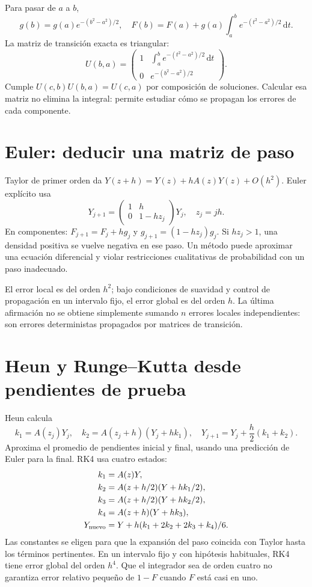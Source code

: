 \documentclass[11pt,a4paper]{article}
\newcommand{\dd}{\,\mathrm d}
\theoremstyle{definition}
\begin{document}
Para pasar de $a$ a $b$,
\[
g(b)=g(a)e^{-(b^2-a^2)/2},\quad
F(b)=F(a)+g(a)\int_a^b e^{-(t^2-a^2)/2}\dd t.
\]
La matriz de transición exacta es triangular:
\[
U(b,a)=
\begin{pmatrix}
1&\displaystyle\int_a^b e^{-(t^2-a^2)/2}\dd t\\
0&e^{-(b^2-a^2)/2}
\end{pmatrix}.
\]
Cumple $U(c,b)U(b,a)=U(c,a)$ por composición de soluciones.
Calcular esa matriz no elimina la integral: permite estudiar cómo se propagan los errores de cada componente.

\section{Euler: deducir una matriz de paso}
Taylor de primer orden da
$Y(z+h)=Y(z)+hA(z)Y(z)+O(h^2)$.
Euler explícito usa
\[
Y_{j+1}=
\begin{pmatrix}1&h\\0&1-hz_j\end{pmatrix}Y_j,
\quad z_j=jh.
\]
En componentes:
$F_{j+1}=F_j+hg_j$ y
$g_{j+1}=(1-hz_j)g_j$.
Si $hz_j>1$, una densidad positiva se vuelve negativa en ese paso.
Un método puede aproximar una ecuación diferencial y violar restricciones cualitativas de probabilidad con un paso inadecuado.

El error local es del orden $h^2$; bajo condiciones de suavidad y control de propagación en un intervalo fijo, el error global es del orden $h$.
La última afirmación no se obtiene simplemente sumando $n$ errores locales independientes: son errores deterministas propagados por matrices de transición.

\section{Heun y Runge--Kutta desde pendientes de prueba}
Heun calcula
\[
k_1=A(z_j)Y_j,\quad
k_2=A(z_j+h)(Y_j+hk_1),\quad
Y_{j+1}=Y_j+\frac h2(k_1+k_2).
\]
Aproxima el promedio de pendientes inicial y final, usando una predicción de Euler para la final.
RK4 usa cuatro estados:
\[
\begin{aligned}
k_1&=A(z)Y,\\
k_2&=A(z+h/2)(Y+hk_1/2),\\
k_3&=A(z+h/2)(Y+hk_2/2),\\
k_4&=A(z+h)(Y+hk_3),\\
Y_{\rm nuevo}&=Y+h(k_1+2k_2+2k_3+k_4)/6.
\end{aligned}
\]
Las constantes se eligen para que la expansión del paso coincida con Taylor hasta los términos pertinentes.
En un intervalo fijo y con hipótesis habituales, RK4 tiene error global del orden $h^4$. Que el integrador sea de orden cuatro no garantiza error relativo pequeño de $1-F$ cuando $F$ está casi en uno.
\end{document}
